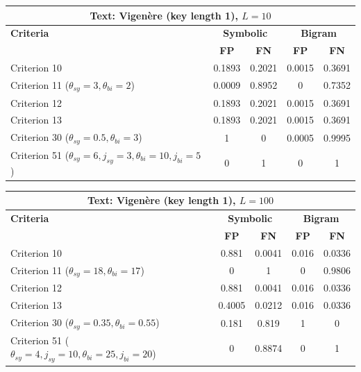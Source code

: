 \begin{center}
\renewcommand{\arraystretch}{1.2}
\setlength{\tabcolsep}{6pt}
\begin{tabular}{|l||c|c||c|c|}
\hline
\multicolumn{5}{|c|}{\textbf{Text: Vigenère (key length 1), $L=10$}} \\
\hline
\textbf{Criteria} & \multicolumn{2}{c||}{\textbf{Symbolic}} & \multicolumn{2}{c|}{\textbf{Bigram}} \\
\hline
 & \textbf{FP} & \textbf{FN} & \textbf{FP} & \textbf{FN} \\
\hline
Criterion 10 & 0.1893 & 0.2021 & 0.0015 & 0.3691 \\
Criterion 11 ($\theta_{sy}=3, \theta_{bi}=2$) & 0.0009 & 0.8952 & 0 & 0.7352 \\
Criterion 12 & 0.1893 & 0.2021 & 0.0015 & 0.3691 \\
Criterion 13 & 0.1893 & 0.2021 & 0.0015 & 0.3691 \\
Criterion 30 ($\theta_{sy}=0.5, \theta_{bi}=3$) & 1 & 0 & 0.0005 & 0.9995 \\
Criterion 51 ($\theta_{sy}=6, j_{sy}=3, \theta_{bi}=10, j_{bi}=5$) & 0 & 1 & 0 & 1 \\
\hline
\end{tabular}
\end{center}

\begin{center}
\renewcommand{\arraystretch}{1.2}
\setlength{\tabcolsep}{6pt}
\begin{tabular}{|l||c|c||c|c|}
\hline
\multicolumn{5}{|c|}{\textbf{Text: Vigenère (key length 1), $L=100$}} \\
\hline
\textbf{Criteria} & \multicolumn{2}{c||}{\textbf{Symbolic}} & \multicolumn{2}{c|}{\textbf{Bigram}} \\
\hline
 & \textbf{FP} & \textbf{FN} & \textbf{FP} & \textbf{FN} \\
\hline
Criterion 10 & 0.881 & 0.0041 & 0.016 & 0.0336 \\
Criterion 11 ($\theta_{sy}=18, \theta_{bi}=17$) & 0 & 1 & 0 & 0.9806 \\
Criterion 12 & 0.881 & 0.0041 & 0.016 & 0.0336 \\
Criterion 13 & 0.4005 & 0.0212 & 0.016 & 0.0336 \\
Criterion 30 ($\theta_{sy}=0.35, \theta_{bi}=0.55$) & 0.181 & 0.819 & 1 & 0 \\
Criterion 51 ($\theta_{sy}=4, j_{sy}=10, \theta_{bi}=25, j_{bi}=20$) & 0 & 0.8874 & 0 & 1 \\
\hline
\end{tabular}
\end{center}

